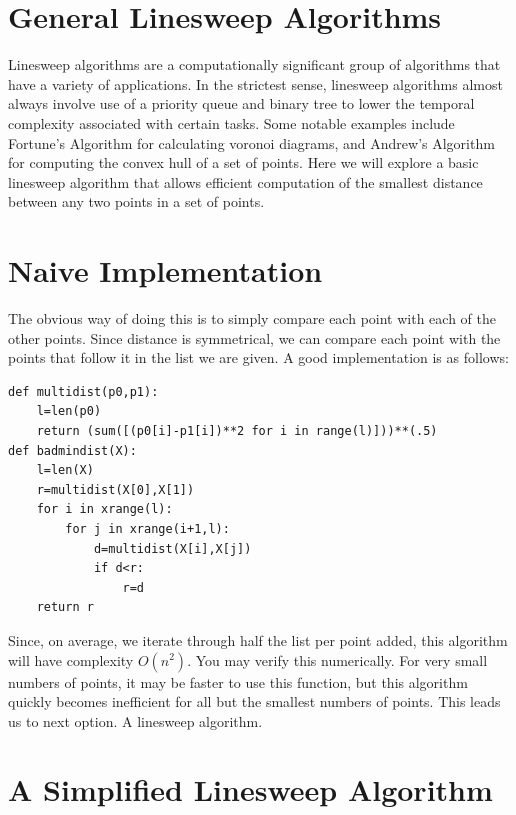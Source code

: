 

\section*{General Linesweep Algorithms}

Linesweep algorithms are a computationally significant group of algorithms that have a variety of applications. 
In the strictest sense, linesweep algorithms almost always involve use of a priority queue and binary tree to lower the temporal complexity associated with certain tasks. 
Some notable examples include Fortune's Algorithm for calculating voronoi diagrams, and Andrew's Algorithm for computing the convex hull of a set of points. 
Here we will explore a basic linesweep algorithm that allows efficient computation of the smallest distance between any two points in a set of points. 

\section*{Naive Implementation}

The obvious way of doing this is to simply compare each point with each of the other points. 
Since distance is symmetrical, we can compare each point with the points that follow it in the list we are given. 
A good implementation is as follows:

\begin{lstlisting}
def multidist(p0,p1):
    l=len(p0)
    return (sum([(p0[i]-p1[i])**2 for i in range(l)]))**(.5)
def badmindist(X):
    l=len(X)
    r=multidist(X[0],X[1])
    for i in xrange(l):
        for j in xrange(i+1,l):
            d=multidist(X[i],X[j])
            if d<r:
                r=d
    return r
\end{lstlisting}

Since, on average, we iterate through half the list per point added, this algorithm will have complexity $O(n^2)$. 
You may verify this numerically. 
For very small numbers of points, it may be faster to use this function, but this algorithm quickly becomes inefficient for all but the smallest numbers of points. 
This leads us to next option. 
A linesweep algorithm.

\section*{A Simplified Linesweep Algorithm}

